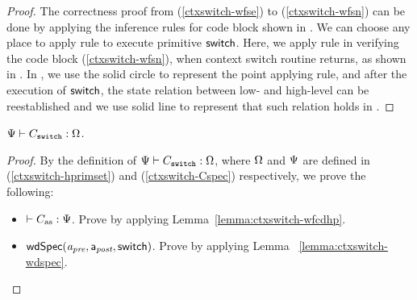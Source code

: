 \begin{proof}
    The correctness proof from
    (\ref{ctxswitch-wfse}) to (\ref{ctxswitch-wfsn})
    can be done by applying the inference rules for
    code block shown in
    \Fig{\ref{fig:Selected Inference Rules for Refinement Verification}}.
    We can choose any place to apply
     rule to execute primitive $\mathsf{switch}$.
    Here, we apply  rule
    in verifying the code block
    \SwitchNewTask{} (\ref{ctxswitch-wfsn}),
    when context switch routine returns,
    as shown in \Fig{\ref{fig:refinement reasoning}}.
    In \Fig{\ref{fig:refinement reasoning}}, we use the
    solid circle to represent the point applying  rule,
    and after the execution of $\mathsf{switch}$, the
    state relation between low- and high-level can
    be reestablished and we use solid line to represent
    that such relation holds in \Fig{\ref{fig:refinement reasoning}}.
\end{proof}

\begin{theorem}
    \em
    ${\Psi} \vdash {C_{\texttt{switch}}} : {\Omega}$.
\end{theorem}
\begin{proof}
    By the definition of
    ${\Psi} \vdash {C_{\texttt{switch}}} : {\Omega}$,
    where $\Omega$ and $\Psi{}$ are defined in
    (\ref{ctxswitch-hprimset}) and (\ref{ctxswitch-Cspec})
    respectively, we prove the following:
    \begin{itemize}
        \item $\vdash {C_{\text{as}}} : {\Psi{}}$.
            Prove by applying Lemma~\ref{lemma:ctxswitch-wfcdhp}.
        \item $\textsf{wdSpec}({\textit{a}_\textit{pre}}, {\mathsf{a}_{\textit{post}}}, {\mathsf{switch}})$.
            Prove by applying Lemma ~\ref{lemma:ctxswitch-wdspec}.
    \end{itemize}
\end{proof}

